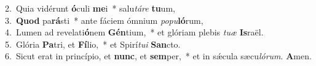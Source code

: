 {2.~}Quia vidérunt \textbf{ó}culi \textbf{me}i~* salu\textit{tá}\textit{re} \textbf{tu}um,\\
{3.~}\textbf{Quod} pa\textbf{rá}sti~* ante fáciem ómnium \textit{po}\textit{pu}\textbf{ló}rum,\\
{4.~}Lumen ad revelati\textbf{ó}nem \textbf{Gén}tium,~* et glóriam plebis \textit{tu}\textit{æ} \textbf{Is}raël.\\
{5.~}Glória \textbf{Pa}tri, et \textbf{Fí}lio,~* et Spirí\textit{tu}\textit{i} \textbf{San}cto.\\
{6.~}Sicut erat in princípio, et \textbf{nunc}, et \textbf{sem}per,~* et in sǽcula sæcu\textit{ló}\textit{rum}. \textbf{A}men.\\
